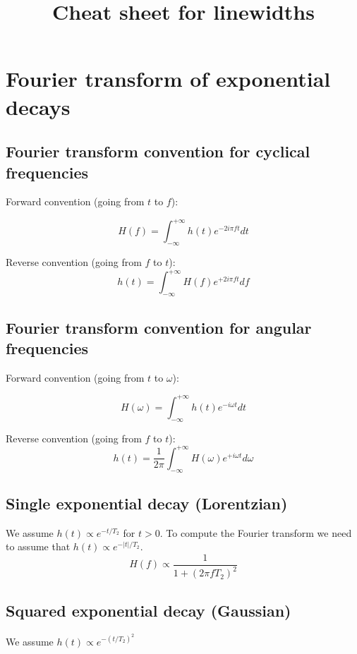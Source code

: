 \documentclass[a4paper]{article}
\title{Cheat sheet for linewidths}
\begin{document}
\maketitle
\section{Fourier transform of exponential decays}
\subsection{Fourier transform convention for cyclical frequencies}
Forward convention (going from $t$ to $f$):

\begin{equation}
H(f)=\int_{-\infty}^{+\infty} h(t) e^{-2i\pi ft} dt
\end{equation}

Reverse convention (going from $f$ to $t$):
\begin{equation}
h(t)=\int_{-\infty}^{+\infty} H(f) e^{+2i\pi ft} df
\end{equation}

\subsection{Fourier transform convention for angular frequencies}
Forward convention (going from $t$ to $\omega$):

\begin{equation}
H(\omega)=\int_{-\infty}^{+\infty} h(t) e^{-i\omega t} dt
\end{equation}

Reverse convention (going from $f$ to $t$):
\begin{equation}
h(t)=\frac{1}{2 \pi}\int_{-\infty}^{+\infty} H(\omega) e^{+i\omega t} d\omega
\end{equation}

\subsection{Single exponential decay (Lorentzian)}

We assume $h(t)\propto e^{-t/T_2}$ for $t>0$. To compute the Fourier transform we need to assume that $h(t)\propto e^{-|t|/T_2}$. 
\begin{equation}
H(f) \propto \frac{1}{1+(2\pi f T_2)^2}
\end{equation}

\subsection{Squared exponential decay (Gaussian)}
We assume $h(t)\propto e^{-(t/T_2)^2}$
\end{document}
